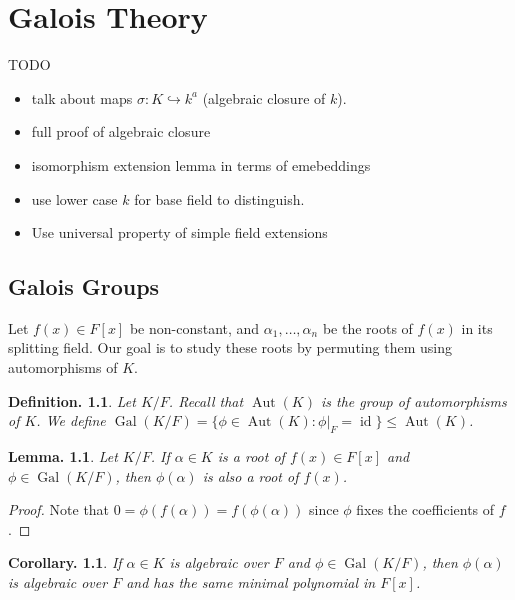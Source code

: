 \documentclass[11pt, a4paper]{memoir}
\theoremstyle{change}
\newtheorem{lemma}[theorem]{Lemma.}
\newtheorem{corollary}[theorem]{Corollary.}
\theoremstyle{plain}
\theoremstyle{nonumberplain}
\newtheorem{definition}{Definition.}
\newtheorem{proof}{Proof}
\DeclareMathOperator{\Aut}{Aut}
\DeclareMathOperator{\Gal}{Gal}
\DeclareMathOperator{\id}{id}
\numberwithin{equation}{section}
\begin{document}
\chapter{Galois Theory}
TODO
\begin{itemize}[nl]
    \item talk about maps $\sigma:K\hookrightarrow k^a$ (algebraic closure of $k$).
    \item full proof of algebraic closure
    \item isomorphism extension lemma in terms of emebeddings
    \item use lower case $k$ for base field to distinguish.
    \item Use universal property of simple field extensions
\end{itemize}
\section{Galois Groups}
Let $f(x)\in F[x]$ be non-constant, and $\alpha_1,\ldots,\alpha_n$ be the roots of $f(x)$ in its splitting field.
Our goal is to study these roots by permuting them using automorphisms of $K$.
\begin{definition}
    Let $K/F$.
    Recall that $\Aut(K)$ is the group of automorphisms of $K$.
    We define $\Gal(K/F)=\{\phi\in\Aut(K):\phi|_F=\id\}\leq\Aut(K)$.
\end{definition}
\begin{lemma}
    Let $K/F$.
    If $\alpha\in K$ is a root of $f(x)\in F[x]$ and $\phi\in\Gal(K/F)$, then $\phi(\alpha)$ is also a root of $f(x)$.
\end{lemma}
\begin{proof}
    Note that $0=\phi(f(\alpha))=f(\phi(\alpha))$ since $\phi$ fixes the coefficients of $f$.
\end{proof}
\begin{corollary}
    If $\alpha\in K$ is algebraic over $F$ and $\phi\in\Gal(K/F)$, then $\phi(\alpha)$ is algebraic over $F$ and has the same minimal polynomial in $F[x]$.
\end{corollary}
\end{document}

